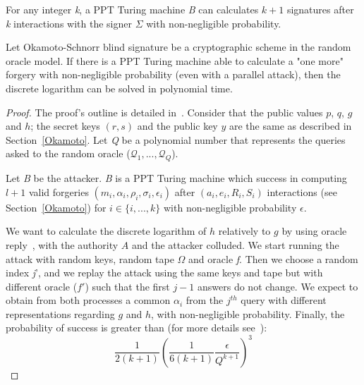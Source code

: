 \documentclass[conference]{llncs}
\begin{document}
\begin{definition}
For any integer \textit{k}, a PPT Turing machine \textit{B} can calculates $k+1$ signatures after \textit{k} interactions with the signer $\Sigma$ with non-negligible probability.  
\end{definition}

\begin{theorem}
Let Okamoto-Schnorr blind signature be a cryptographic scheme in the random oracle model. If there is a PPT Turing machine able to calculate a "one more" forgery with non-negligible probability (even with a parallel attack), then the discrete logarithm can be solved in polynomial time.
\end{theorem}

\begin{proof}
The proof's outline is detailed in~\cite{pointcheval1996provably}.
Consider that the public values $p$, $q$, $g$ and $h$; the secret keys $(r,s)$ and the public key $y$ are the same as described in Section~\ref{Okamoto}. Let \textit{Q} be a polynomial number that represents the queries asked to the random oracle ($\mathcal{Q}_1,...,\mathcal{Q}_Q$).

Let \textit{B} be the attacker. \textit{B} is a PPT Turing machine which success in computing  $l+1$ valid forgeries $(m_i,\alpha_i,\rho_i,\sigma_i,\epsilon_i)$ after $(a_i,e_i,R_i,S_i)$ interactions (see Section~\ref{Okamoto}) for $i\in\{i,...,k\}$ with non-negligible probability $\epsilon$.

We want to calculate the discrete logarithm of $h$ relatively to $g$ by using oracle reply~\cite{10.1007/3-540-68339-9_33}, with the authority $A$ and the attacker colluded. We start running the attack with random keys, random tape $\Omega$ and oracle \textit{f}. Then we choose a random index \textit{j}', and we replay the attack using the same keys and tape but with different oracle ($f'$) such that the first $j-1$ answers do not change. We expect to obtain from both processes a common $\alpha_i$ from the $j^{th}$ query with different representations regarding $g$ and $h$, with non-negligible probability. Finally, the probability of success is greater than (for more details see~\cite{pointcheval1996provably}):
\begin{equation}
    \frac{1}{2(k+1)}\left(\frac{1}{6(k+1)}\frac{\epsilon}{Q^{k+1}}\right)^3
\end{equation}
\end{proof}
\end{document}
